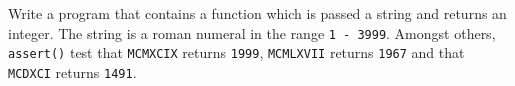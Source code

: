 \begin{exercise}
Write a program that contains a function which is passed a string and returns an integer.
The string is a roman numeral in the range
\verb^1 - 3999^. Amongst
others, \verb^assert()^ test that \verb^MCMXCIX^ returns \verb^1999^,
\verb^MCMLXVII^ returns \verb^1967^ and that \verb^MCDXCI^ returns
\verb^1491^.
\end{exercise}
